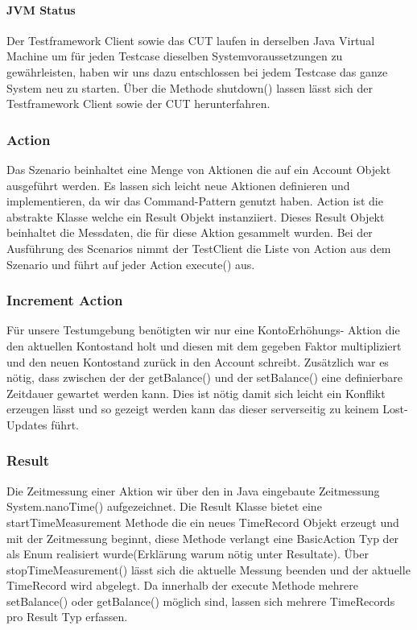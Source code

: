 \paragraph{JVM Status} 
Der Testframework Client sowie das CUT laufen in derselben Java Virtual Machine um für jeden Testcase dieselben Systemvoraussetzungen zu gewährleisten, haben wir uns dazu entschlossen bei jedem Testcase das ganze System neu zu starten. Über die Methode shutdown() lassen lässt sich der Testframework Client sowie der CUT herunterfahren.

\subsubsection{Action}
\label{sec:action}
Das Szenario beinhaltet eine Menge von Aktionen die auf ein Account Objekt ausgeführt werden.  Es lassen sich leicht neue Aktionen definieren und implementieren, da wir das Command-Pattern genutzt haben. Action ist die abstrakte Klasse welche ein Result Objekt instanziiert. Dieses Result Objekt beinhaltet die Messdaten, die für diese Aktion gesammelt wurden. Bei der Ausführung des Scenarios nimmt der TestClient die Liste von Action aus dem Szenario und führt auf jeder Action execute() aus.
 
\subsubsection{Increment Action}
\label{sec:incrementAction}
Für unsere Testumgebung benötigten wir nur eine KontoErhöhungs- Aktion die den aktuellen Kontostand holt und diesen mit dem gegeben Faktor multipliziert und den neuen Kontostand zurück in den Account schreibt. Zusätzlich war es nötig, dass zwischen der der getBalance() und der setBalance() eine definierbare Zeitdauer gewartet werden kann. Dies ist nötig damit sich leicht ein Konflikt erzeugen lässt und so gezeigt werden kann das  dieser serverseitig zu keinem Lost-Updates führt.

\subsubsection{Result}
\label{sec:result}
Die Zeitmessung einer Aktion wir über den in Java eingebaute Zeitmessung System.nanoTime() aufgezeichnet. Die Result Klasse bietet eine startTimeMeasurement Methode die ein neues TimeRecord Objekt erzeugt und mit der Zeitmessung beginnt, diese Methode verlangt eine BasicAction Typ der als Enum realisiert wurde(Erklärung warum nötig unter Resultate). Über stopTimeMeasurement() lässt sich die aktuelle Messung beenden und der aktuelle TimeRecord wird abgelegt. Da innerhalb der execute Methode mehrere setBalance() oder getBalance() möglich sind, lassen sich mehrere TimeRecords pro Result Typ erfassen.


